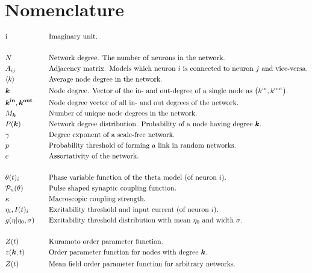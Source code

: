 \newpage
\section{Nomenclature}
\vspace{-.5cm}
\begin{alignat*}{2}
& \ic&&\text{Imaginary unit.}\\ \\
& N &&\text{Network degree. The number of neurons in the network.}\\
& A_{ij} &&\text{Adjacency matrix. Models which neuron $i$ is connected to neuron $j$ and vice-versa.}\\
& \kmean &&\text{Average node degree in the network.}\\
& \k &&\text{Node degree. Vector of the in- and out-degree of a single node as $\left(\kin, \kout \right)$.}\\
& \kinb, \koutb && \text{Node degree vector of all in- and out degrees of the network.} \\
& M_{\k} &&\text{Number of unique node degrees in the network.}\\
& P(\k) &&\text{Network degree distribution. Probability of a node having degree $\k$.}\\
&\gamma &&\text{Degree exponent of a scale-free network.}\\ 
&p &&\text{Probability threshold of forming a link in random networks.}\\ 
&c &&\text{Assortativity of the network.}\\ \\
&\theta(t)_i &&\text{Phase variable function of the theta model (of neuron $i$).}\\
& \Pulse_n (\theta)&&\text{Pulse shaped synaptic coupling function.}\\
&\kappa &&\text{Macroscopic coupling strength.}\\
&\eta_i, I(t)_i &&\text{Excitability threshold and input current (of neuron $i$).}\\
&g(\eta \rvert \eta_0, \sigma) \quad &&\text{Excitability threshold distribution with mean $\eta_0$ and width $\sigma$.}\\ \\
& Z(t) &&\text{Kuramoto order parameter function.}\\
& z(\k, t) &&\text{Order parameter function for nodes with degree $\k$.}\\
& \bar{Z}(t) &&\text{Mean field order parameter function for arbitrary networks.}\\ \\

\end{alignat*}

